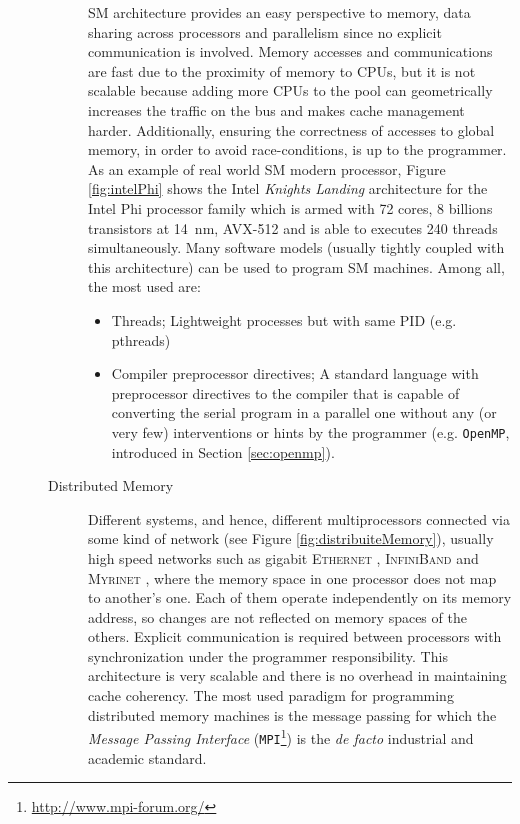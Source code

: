 \begin{description}
\begin{description}
\begin{itemize}
\begin{figure}[b]
		\end{figure}
	\end{itemize}
	SM architecture provides an easy perspective to memory,	data sharing across processors and parallelism since no explicit communication is involved. Memory accesses and communications are fast due to the proximity of memory to CPUs, but it is not scalable because adding more CPUs to the pool can geometrically increases the traffic on the bus and makes cache management harder. Additionally, ensuring the correctness of accesses to global memory, in order to avoid race-conditions, is up to the programmer.
	As an example of real world SM modern processor, Figure \ref{fig:intelPhi} shows the Intel \textit{Knights Landing} architecture for the Intel Phi processor family which is armed with 72 cores, $8$ billions transistors at \SI{14}{\nano\metre}, AVX-512 and is able to executes 240 threads simultaneously.
	Many software models (usually tightly coupled with this architecture) can be used to program SM machines. Among all, the most used are:
	\begin{itemize}
		\item Threads; Lightweight processes but with same PID (e.g. pthreads)
		\item Compiler preprocessor directives; A standard language with preprocessor directives to the compiler that is capable of converting the serial program in a parallel one without any (or very few) interventions or hints by the programmer (e.g. \texttt{OpenMP}, introduced in Section \ref{sec:openmp}).		
	\end{itemize}	
	\item [Distributed Memory] 	Different systems, and hence, different multiprocessors connected via some kind of network (see Figure \ref{fig:distribuiteMemory}), usually high speed networks such as gigabit \textsc{Ethernet} \cite{Spurgeon:2000:EDG:336070}, \textsc{InfiniBand} \cite{Shanley:2002:INF:579371} and \textsc{Myrinet} \cite{Boden:1995:MGL:623261.623898}, where the memory space in one processor does not map to another's one.
	Each of them operate independently on its memory address, so changes are not reflected on memory spaces of the others. Explicit communication is required between processors with synchronization under the programmer responsibility.
	This architecture  is very scalable and there is no  overhead in maintaining	cache coherency. 	
	The most used paradigm for programming distributed memory machines is the
	message passing for which the \textit{Message Passing Interface} (\texttt{MPI}\footnote{\url{http://www.mpi-forum.org/}}) \cite{Forum:1994:MMI:898758,Gropp:1999:UMA:555151} is the \textit{de facto} industrial and academic standard.
	

\end{description}
\end{description}
